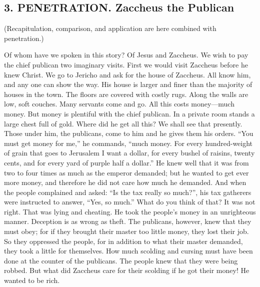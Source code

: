 \subsection{3. PENETRATION. Zaccheus the Publican} (Recapitulation, comparison, and application are here combined with penetration.)

Of whom have we spoken in this story? Of Jesus and Zaccheus. We wish to pay the chief publican two imaginary visits. First we would visit Zaccheus before he knew Christ. We go to Jericho and ask for the house of Zaccheus. All know him, and any one can show the way. His house is larger and finer than the majority of houses in the town. The floors are covered with costly rugs. Along the walls are low, soft couches. Many servants come and go. All this costs money—much money. But money is plentiful with the chief publican. In a private room stands a large chest full of gold. Where did he get all this? We shall see that presently. Those under him, the publicans, come to him and he gives them his orders. “You must get money for me,” he commands, “much money. For every hundred-weight of grain that goes to Jerusalem I want a dollar, for every bushel of raisins, twenty cents, and for every yard of purple half a dollar.” He knew well that it was from two to four times as much as the emperor demanded; but he wanted to get ever more money, and therefore he did not care how much he demanded. And when the people complained and asked: “Is the tax really so much?”, his tax gatherers were instructed to answer, “Yes, so much.” What do you think of that? It was not right. That was lying and cheating. He took the people’s money in an unrighteous manner. Deception is as wrong as theft. The publicans, however, knew that they must obey; for if they brought their master too little money, they lost their job. So they oppressed the people, for in addition to what their master demanded, they took a little for themselves. How much scolding and cursing must have been done at the counter of the publicans. The people knew that they were being robbed. But what did Zaccheus care for their scolding if he got their money! He wanted to be rich.

